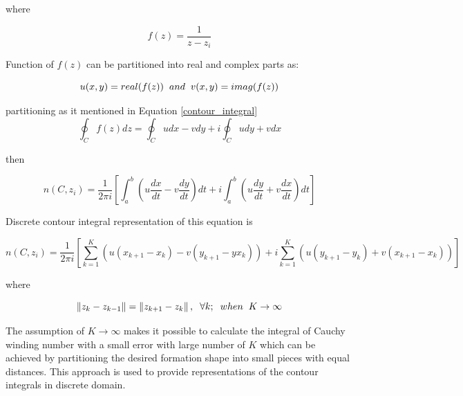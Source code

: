 where 

\begin{equation}
f(z) = \frac{1}{z-z_i}
\end{equation}
		
Function of $f(z)$ can be partitioned into real and complex parts as:

\begin{equation}
u(x,y) = real(f(z))  \hspace{0.2cm} and \hspace{0.2cm} v(x,y) = imag(f(z))
\end{equation}
		
partitioning as it mentioned in Equation \ref{contour_integral}
\begin{equation}
\oint_C f(z)dz  = \oint_C u dx - v dy + i \oint_C u dy + v dx 
\end{equation}

then

\begin{equation}
n(C,z_i)  = \frac{1}{2\pi i} \left[\int_{a}^{b} \left(u\frac{dx}{dt} - v\frac{dy}{dt}\right)dt + i\int_{a}^{b}\left(u\frac{dy}{dt} + v\frac{dx}{dt}\right)dt\right]
\end{equation}
		
Discrete contour integral representation of this equation is
		
\begin{equation}
n(C,z_i)  = \frac{1}{2\pi i} \left[\sum_{k=1}^{K} \left(u(x_{k+1} - x_k ) - v(y_{k+1} -yx_k )\right) + i\sum_{k=1}^{K}\left(u(y_{k+1} - y_k ) + v(x_{k+1} - x_k )\right)\right]
\end{equation}

where

\begin{equation}
\left\lVert z_k - z_{k-1}\right\rVert = \left\lVert z_{k+1} - z_k\right\rVert, \hspace{0.2cm}  \forall k ;  \hspace{0.2cm} when  \hspace{0.2cm} K \to\infty
\end{equation}

The assumption of $K \to\infty$ makes it possible to calculate the integral of Cauchy winding number with a small error with large number of $K$ which can be achieved by partitioning the desired formation shape  into small pieces with equal  distances. This approach is used to provide representations of the contour integrals in discrete domain. 

